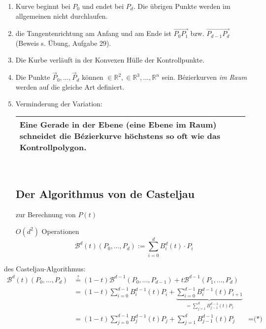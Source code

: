 \begin{enumerate}
 \item Kurve beginnt bei $P_0$ und endet bei $P_d$. Die übrigen Punkte werden im allgemeinen nicht durchlaufen.
 \item die Tangentenrichtung am Anfang und am Ende ist $\overrightarrow{P_0P_1}$ bzw.
	$\overrightarrow{P_{d-1}P_d}$ (Beweis s. Übung, Aufgabe 29).
 \item Die Kurbe verläuft in der Konvexen Hülle der Kontrollpunkte.
	\begin{center}
	\end{center}
 \item Die Punkte $\vec P_0, ..., \vec P_d$ können $\in \mathbb{R}^2, \in \mathbb{R}^3, ..., \mathbb{R}^n$ sein.
	Bézierkurven \emph{im Raum} werden auf die gleiche Art definiert.
 \item Verminderung der Variation:
	\begin{center}
	 \begin{tabular}{|p{0.97\linewidth}|}
	  \hline
	  Eine Gerade in der Ebene (eine Ebene im Raum) schneidet die Bézierkurve höchstens so oft wie das
	  Kontrollpolygon.\\
	  \hline
	 \end{tabular}\\
	\end{center}
\subsection{Der Algorithmus von de Casteljau}
zur Berechnung von $P(t)$
\begin{center}
\end{center}
$O(d^2)$ Operationen
\[\mathcal B^d(t)(P_0,...,P_d) := \sum\limits_{i=0}^d B_i^d(t) \cdot P_i\]
\end{enumerate}
\Bew des Casteljau-Algorithmus:
\begin{align*}
 \mathcal B^d(t)(P_0,...,P_d) &\stackrel{?}= (1-t) \mathcal B^{d-1}(P_0, ..., P_{d-1})
	+ t \mathcal B^{d-1}(P_1, ..., P_d)\\
	&= (1-t) \sum\limits_{i=0}^{d-1} B_i^{d-1}(t) P_i +
		 \underbrace{\sum\limits_{i=0}^{d-1} B_i^{d-1}(t) P_{i+1}}_
			{=\sum\limits_{j=1}^{d} B_{j-1}^{d-1}(t) P_j}\\
	&= (1-t) \sum\limits_{j=0}^{d-1} B_j^{d-1}(t) P_{j} + \sum\limits_{j=1}^{d} B_{j-1}^{d-1}(t) P_j
	&= \text{(*) verwenden}\\
\end{align*}
